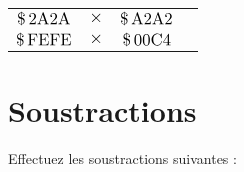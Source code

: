 \documentclass[11pt,a4paper]{article}
\begin{document}
{\begin{tabular}{ | c c c | C{6cm} |}
 & & & \\
\hline
{} &  &  & \\
 & & & \\
\hline
{} &  &  & \\
 & & & \\
\hline
\end{tabular}
}

\vfillLast

\clearpage


\section{Soustractions}


\medskip

Effectuez les soustractions suivantes :

\bigskip

\vfillFirst
\end{document}
